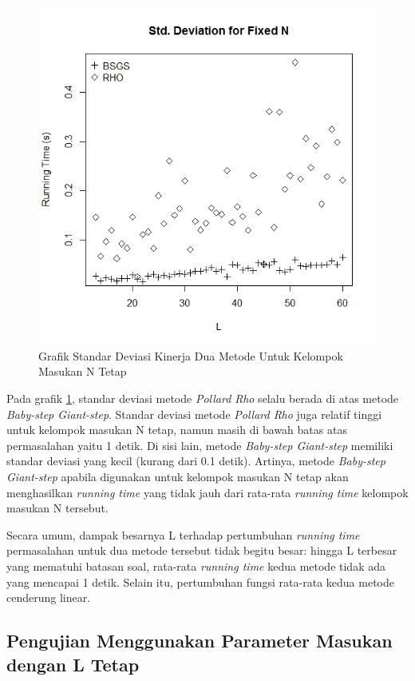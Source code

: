 \begin{figure}[h!]
	\Centering
	\includegraphics[angle=0, scale=0.55]{bab5/img/sdev-fixed-n}
	\caption{Grafik Standar Deviasi Kinerja Dua Metode Untuk Kelompok Masukan N Tetap}
	\label{fig:stddev_fixed_n}
\end{figure}

Pada grafik \ref{fig:stddev_fixed_n}, standar deviasi metode \textit{Pollard Rho} selalu berada di atas metode \textit{Baby-step Giant-step}. Standar deviasi metode \textit{Pollard Rho} juga relatif tinggi untuk kelompok masukan N tetap, namun masih di bawah batas atas permasalahan yaitu 1 detik. Di sisi lain, metode \textit{Baby-step Giant-step} memiliki standar deviasi yang kecil (kurang dari 0.1 detik). Artinya, metode \textit{Baby-step Giant-step} apabila digunakan untuk kelompok masukan N tetap akan menghasilkan \textit{running time} yang tidak jauh dari rata-rata \textit{running time} kelompok masukan N tersebut.

Secara umum, dampak besarnya L terhadap pertumbuhan \textit{running time} permasalahan untuk dua metode tersebut tidak begitu besar: hingga L terbesar yang mematuhi batasan soal, rata-rata \textit{running time} kedua metode tidak ada yang mencapai 1 detik. Selain itu, pertumbuhan fungsi rata-rata kedua metode cenderung linear.

\subsection{Pengujian Menggunakan Parameter Masukan dengan L Tetap}

